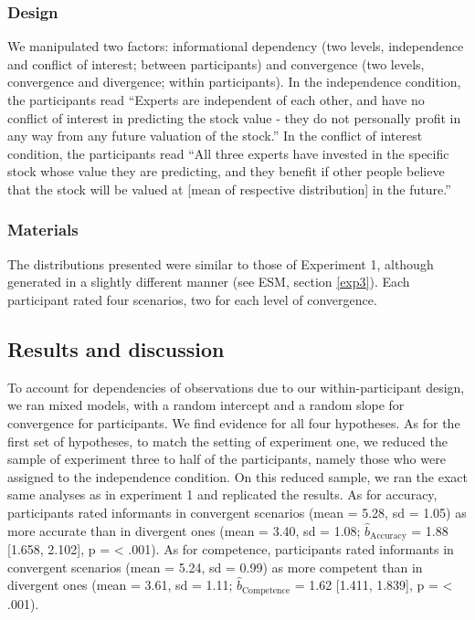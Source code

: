 \documentclass[
  doc,floatsintext]{apa6}
\begin{document}
\subsubsection{Design}\label{design-2}

We manipulated two factors: informational dependency (two levels, independence and conflict of interest; between participants) and convergence (two levels, convergence and divergence; within participants). In the independence condition, the participants read ``Experts are independent of each other, and have no conflict of interest in predicting the stock value - they do not personally profit in any way from any future valuation of the stock.'' In the conflict of interest condition, the participants read ``All three experts have invested in the specific stock whose value they are predicting, and they benefit if other people believe that the stock will be valued at {[}mean of respective distribution{]} in the future.''

\subsubsection{Materials}\label{materials-2}

The distributions presented were similar to those of Experiment 1, although generated in a slightly different manner (see ESM, section \ref{exp3}). Each participant rated four scenarios, two for each level of convergence.

\subsection{Results and discussion}\label{results-and-discussion-2}

To account for dependencies of observations due to our within-participant design, we ran mixed models, with a random intercept and a random slope for convergence for participants. We find evidence for all four hypotheses. As for the first set of hypotheses, to match the setting of experiment one, we reduced the sample of experiment three to half of the participants, namely those who were assigned to the independence condition. On this reduced sample, we ran the exact same analyses as in experiment 1 and replicated the results. As for accuracy, participants rated informants in convergent scenarios (mean = 5.28, sd = 1.05) as more accurate than in divergent ones (mean = 3.40, sd = 1.08; \(\hat{b}_{\text{Accuracy}}\) = 1.88 {[}1.658, 2.102{]}, p = \textless{} .001). As for competence, participants rated informants in convergent scenarios (mean = 5.24, sd = 0.99) as more competent than in divergent ones (mean = 3.61, sd = 1.11; \(\hat{b}_{\text{Competence}}\) = 1.62 {[}1.411, 1.839{]}, p = \textless{} .001).
\end{document}
